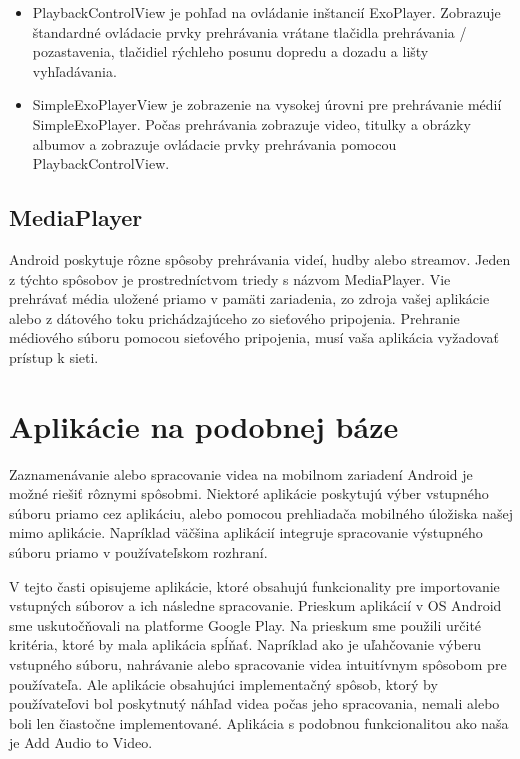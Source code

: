 \documentclass[12pt, oneside]{book}
\begin{document}
\begin{itemize}
    \item PlaybackControlView je pohľad na ovládanie inštancií ExoPlayer. Zobrazuje štandardné ovládacie prvky prehrávania vrátane tlačidla prehrávania / pozastavenia, tlačidiel rýchleho posunu dopredu a dozadu a lišty vyhľadávania.
    \item SimpleExoPlayerView je zobrazenie na vysokej úrovni pre prehrávanie médií SimpleExoPlayer. Počas prehrávania zobrazuje video, titulky a obrázky albumov a zobrazuje ovládacie prvky prehrávania pomocou PlaybackControlView.
\end{itemize}

\subsection{MediaPlayer}

\hspace{15pt}Android poskytuje rôzne spôsoby prehrávania videí, hudby alebo streamov. Jeden z týchto spôsobov je prostredníctvom triedy s názvom MediaPlayer. Vie prehrávať média uložené priamo v pamäti zariadenia, zo zdroja vašej aplikácie alebo z dátového toku prichádzajúceho zo sieťového pripojenia. Prehranie médiového súboru pomocou sieťového pripojenia, musí vaša aplikácia vyžadovať prístup k sieti.

\section{Aplikácie na podobnej báze}

\hspace{15pt} Zaznamenávanie alebo spracovanie videa na mobilnom zariadení Android je možné riešiť rôznymi spôsobmi. Niektoré aplikácie poskytujú výber vstupného súboru priamo cez aplikáciu, alebo pomocou prehliadača mobilného úložiska našej mimo aplikácie. Napríklad väčšina aplikácií integruje spracovanie výstupného súboru priamo v používateľskom rozhraní.

V tejto časti opisujeme aplikácie, ktoré obsahujú funkcionality pre importovanie vstupných súborov a ich následne spracovanie. Prieskum aplikácií v OS Android sme uskutočňovali na platforme Google Play. Na prieskum sme použili určité kritéria, ktoré by mala aplikácia spĺňať. Napríklad ako je uľahčovanie výberu vstupného súboru, nahrávanie alebo spracovanie videa intuitívnym spôsobom pre používateľa. Ale aplikácie obsahujúci implementačný spôsob, ktorý by používateľovi bol poskytnutý náhľad videa počas jeho spracovania, nemali alebo boli len čiastočne implementované. Aplikácia s podobnou funkcionalitou ako naša je Add Audio to Video.
\end{document}
